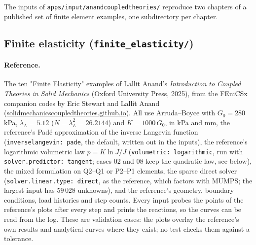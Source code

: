 \documentclass[11pt]{article}
\DeclareRobustCommand{\code}[1]{{\def\_{\textunderscore\allowbreak}\texttt{#1}}}
\DeclareRobustCommand{\file}[1]{{\def\_{\textunderscore\allowbreak}\texttt{#1}}}
\begin{document}
The inputs of \file{apps/input/anand\_coupled\_theories/} reproduce two
chapters of a published set of finite element examples, one subdirectory per
chapter.

\subsection{Finite elasticity (\texttt{finite\_elasticity/})}

\paragraph{Reference.}
The ten "Finite Elasticity" examples of Lallit Anand's \emph{Introduction
to Coupled Theories in Solid Mechanics} (Oxford University Press, 2025),
from the FEniCSx companion codes by Eric Stewart and Lallit Anand
(\url{solidmechanicscoupledtheories.github.io}).  All use Arruda--Boyce
with $G_0 = 280$\,kPa, $\lambda_L = 5.12$ ($N = \lambda_L^2 = 26.2144$) and
$K = 1000\,G_0$, in kPa and mm, the reference's Pad\'e approximation of
the inverse Langevin function (\code{inverse\_langevin: pade}, the
default, written out in the inputs), the
reference's logarithmic volumetric law
$p = K\ln J/J$ (\code{volumetric: logarithmic}, run with
\code{solver.predictor: tangent}; cases 02 and 08 keep the quadratic law,
see below), the mixed formulation on
Q2--Q1 or P2--P1 elements, the sparse direct solver
(\code{solver.linear.type: direct}, as the reference, which factors with
MUMPS; the largest input has $59\,028$ unknowns), and the reference's geometry, boundary
conditions, load histories and step counts.  Every input probes the points of the
reference's plots after every step and prints the reactions, so the curves
can be read from the log.  These are validation cases: the plots overlay the
reference's own results and analytical curves where they exist; no test
checks them against a tolerance.
\end{document}
